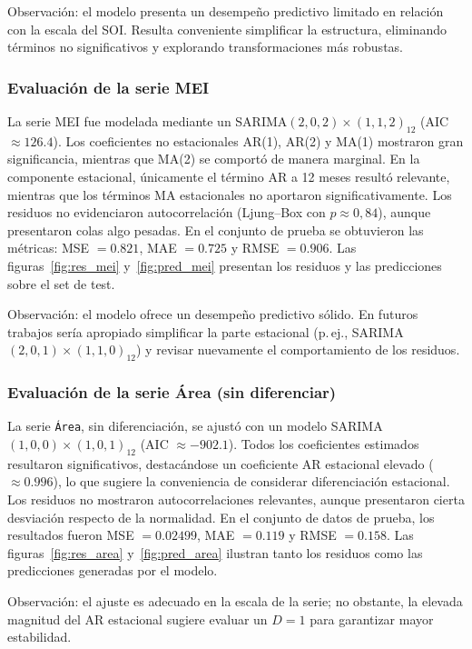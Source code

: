 Observación: el modelo presenta un desempeño predictivo limitado en relación con la escala del SOI. Resulta conveniente simplificar la estructura, eliminando términos no significativos y explorando transformaciones más robustas.  
\vspace{0.3em}


\subsubsection{Evaluación de la serie MEI}
La serie MEI fue modelada mediante un SARIMA$(2,0,2)\times(1,1,2)_{12}$ (AIC $\approx 126.4$). 
Los coeficientes no estacionales AR(1), AR(2) y MA(1) mostraron gran significancia, mientras que MA(2) se comportó de manera marginal. En la componente estacional, únicamente el término AR a 12 meses resultó relevante, mientras que los términos MA estacionales no aportaron significativamente. Los residuos no evidenciaron autocorrelación (Ljung--Box con $p\approx 0,84$), aunque presentaron colas algo pesadas.  
En el conjunto de prueba se obtuvieron las métricas: MSE $=0.821$, MAE $=0.725$ y RMSE $=0.906$. Las figuras~\ref{fig:res_mei} y~\ref{fig:pred_mei} presentan los residuos y las predicciones sobre el set de test.  

Observación: el modelo ofrece un desempeño predictivo sólido. En futuros trabajos sería apropiado simplificar la parte estacional (p.\,ej., SARIMA$(2,0,1)\times(1,1,0)_{12}$) y revisar nuevamente el comportamiento de los residuos.  
\vspace{0.3em}


\subsubsection{Evaluación de la serie Área (sin diferenciar)}
La serie \texttt{Área}, sin diferenciación, se ajustó con un modelo SARIMA$(1,0,0)\times(1,0,1)_{12}$ (AIC $\approx -902.1$). 
Todos los coeficientes estimados resultaron significativos, destacándose un coeficiente AR estacional elevado ($\approx 0.996$), lo que sugiere la conveniencia de considerar diferenciación estacional. Los residuos no mostraron autocorrelaciones relevantes, aunque presentaron cierta desviación respecto de la normalidad.  
En el conjunto de datos de prueba, los resultados fueron MSE $=0.02499$, MAE $=0.119$ y RMSE $=0.158$. Las figuras~\ref{fig:res_area} y~\ref{fig:pred_area} ilustran tanto los residuos como las predicciones generadas por el modelo.  

Observación: el ajuste es adecuado en la escala de la serie; no obstante, la elevada magnitud del AR estacional sugiere evaluar un $D=1$ para garantizar mayor estabilidad.  
\vspace{0.3em}


